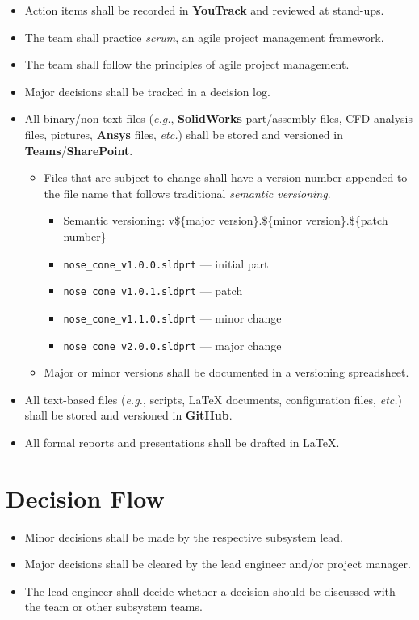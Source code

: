 \begin{itemize}
    \item Action items shall be recorded in \textbf{YouTrack} and reviewed at stand-ups.
    \item The team shall practice \textit{scrum}, an agile project management framework.
    \item The team shall follow the principles of agile project management.
    \item Major decisions shall be tracked in a decision log.
    \item All binary/non-text files (\textit{e.g.}, \textbf{SolidWorks} part/assembly files, CFD analysis files, pictures, \textbf{Ansys} files, \textit{etc.}) shall be stored and versioned in \textbf{Teams}/\textbf{SharePoint}.
    \begin{itemize}
        \item Files that are subject to change shall have a version number appended to the file name that follows traditional \textit{semantic versioning}.
        \begin{itemize}
            \item Semantic versioning: v\$\{major version\}.\$\{minor version\}.\$\{patch number\}
            \item \verb|nose_cone_v1.0.0.sldprt| — initial part
            \item \verb|nose_cone_v1.0.1.sldprt| — patch
            \item \verb|nose_cone_v1.1.0.sldprt| — minor change
            \item \verb|nose_cone_v2.0.0.sldprt| — major change
        \end{itemize}
        \item Major or minor versions shall be documented in a versioning spreadsheet.
    \end{itemize}
    \item All text-based files (\textit{e.g.}, scripts, \LaTeX{} documents, configuration files, \textit{etc.}) shall be stored and versioned in \textbf{GitHub}.
    \item All formal reports and presentations shall be drafted in \LaTeX.
\end{itemize}

\section{Decision Flow}

\begin{itemize}
    \item Minor decisions shall be made by the respective subsystem lead.
    \item Major decisions shall be cleared by the lead engineer and/or project manager.
    \item The lead engineer shall decide whether a decision should be discussed with the team or other subsystem teams.
\end{itemize}

